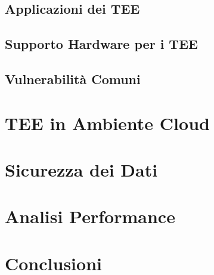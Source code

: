 \documentclass[12pt,italian]{report}
\begin{document}
 	
 	\section{Applicazioni dei TEE}
 	\label{sec:applicazioni}
	
	\section{Supporto Hardware per i TEE}
	\label{sec:supporto-hw}
	
	\section{Vulnerabilità Comuni}
	\label{sec:vulnerabilità}
	
	
	
	\chapter{TEE in Ambiente Cloud}
	\label{cap:problema}
	
	
	
	\chapter{Sicurezza dei Dati}
	\label{cap:implementazione}
	
	
	
	\chapter{Analisi Performance}
	\label{cap:dati}
	
	\chapter{Conclusioni}
	\label{cap:conclusioni}
	
	
	
\end{document}
